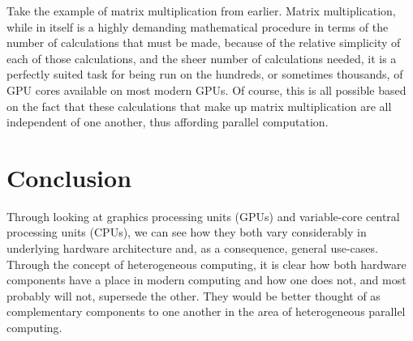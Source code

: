 \documentclass[a4paper,11pt]{article}
\begin{document}
Take the example of matrix multiplication from earlier. Matrix multiplication, while in itself is a highly demanding
mathematical procedure in terms of the number of calculations that must be made, because of the relative simplicity of
each of those calculations, and the sheer number of calculations needed, it is a perfectly suited task for being run on the hundreds,
or sometimes thousands, of GPU cores available on most modern GPUs. Of course, this is all possible based on the fact
that these calculations that make up matrix multiplication are all independent of one another, thus affording parallel
computation.



\newpage


\section{Conclusion} %
\label{sec:conclusion}
Through looking at graphics processing units (GPUs) and variable-core central processing units (CPUs), we can see how
they both vary considerably in underlying hardware architecture and, as a consequence, general use-cases. Through the
concept of heterogeneous computing, it is clear how both hardware components have a place in modern computing and how
one does not, and most probably will not, supersede the other. They would be better thought of as complementary components
to one another in the area of heterogeneous parallel computing.


\newpage




\end{document}
